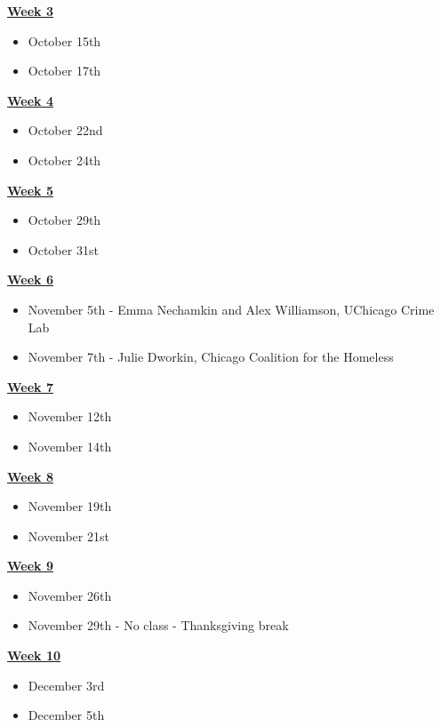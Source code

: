 \documentclass{article}
\begin{document}
\noindent
\textbf{\underline{Week 3}}
\begin{itemize}
\item October 15th
\item October 17th
\end{itemize}
\bigskip

\noindent
\textbf{\underline{Week 4}}
\begin{itemize}
\item October 22nd
\item October 24th
\end{itemize}
\bigskip

\noindent
\textbf{\underline{Week 5}}
\begin{itemize}
\item October 29th
\item October 31st
\end{itemize}
\bigskip

\noindent
\textbf{\underline{Week 6}}
\begin{itemize}
\item November 5th - Emma Nechamkin and Alex Williamson, UChicago Crime Lab
\item November 7th - Julie Dworkin, Chicago Coalition for the Homeless
\end{itemize}
\bigskip

\noindent
\textbf{\underline{Week 7}}
\begin{itemize}
\item November 12th
\item November 14th
\end{itemize}
\bigskip

\noindent
\textbf{\underline{Week 8}}
\begin{itemize}
\item November 19th
\item November 21st
\end{itemize}
\bigskip

\noindent
\textbf{\underline{Week 9}}
\begin{itemize}
\item November 26th
\item November 29th - No class - Thanksgiving break
\end{itemize}
\bigskip

\noindent
\textbf{\underline{Week 10}}
\begin{itemize}
\item December 3rd
\item December 5th
\end{itemize}
\bigskip
\end{document}

